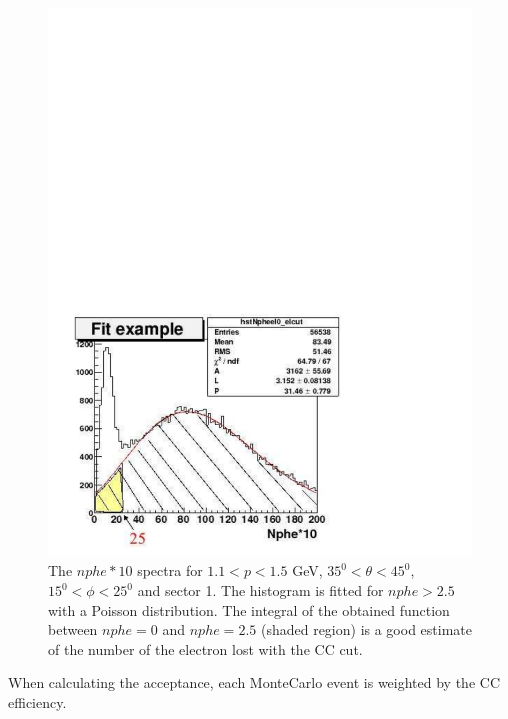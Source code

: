 \begin{figure}[h]
  \includegraphics[width = 12cm, bb=-60 10 380 540]{data_reduction/img/ludy_cc_pic1}
  \caption[The $nphe$ spectra for $1.1 < p < 1.5$ GeV, $35^0 < \theta < 45^0$, $15^0 < \phi < 25^0$]
          { The $nphe*10$ spectra for $1.1 < p < 1.5$ GeV, $35^0 < \theta < 45^0$, $15^0 < \phi < 25^0$
	             and sector 1. The histogram is fitted for $nphe > 2.5$ with a Poisson distribution.
		     The integral of the obtained function between $nphe =0$ and $nphe=2.5$ (shaded region) 
		     is a good estimate of the number of the electron lost with the CC cut.
		     }
 \label{fig:ludy}
\end{figure}


When calculating the acceptance, each MonteCarlo event is weighted by the CC efficiency.

